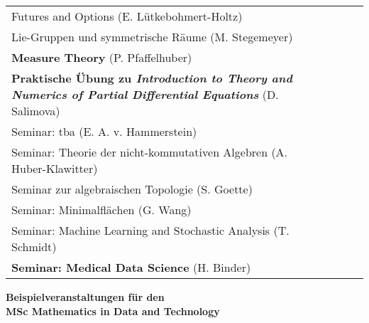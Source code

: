 \documentclass[11pt,a4paper]{article}
\newcommand{\xmark}{\ding{55}}
\begin{document}
\begin{longtable}{p{}|c|c|c|c|c}
Futures and Options (E. Lütkebohmert-Holtz) & & &  \xmark & & \\[1ex]
Lie-Gruppen und symmetrische Räume (M. Stegemeyer) & & & & \xmark & \\[1ex]
{\bf Measure Theory} (P. Pfaffelhuber) & & & &  \xmark & \\[1ex]
{\bf Praktische Übung zu {\em Introduction to Theory and Numerics of Partial Differential Equations}} (D. Salimova) & & & &  \xmark & \\[1ex]
Seminar: tba (E. A. v. Hammerstein) & & & & &  \xmark \\[1ex]
Seminar: Theorie der nicht-kommutativen Algebren (A. Huber-Klawitter) & & & & &  \xmark \\[1ex]
Seminar zur algebraischen Topologie (S. Goette) & & & & &  \xmark \\[1ex]
Seminar: Minimalflächen (G. Wang) & & & & &  \xmark \\[1ex]
Seminar: Machine Learning and Stochastic Analysis (T. Schmidt) & & & & &  \xmark \\[1ex]
{\bf Seminar: Medical Data Science} (H. Binder) & & & & &  \xmark \\[1ex]
\end{longtable}



\clearpage
{}
\thispagestyle{empty}
\vspace*{\fill}
\begin{center}
\Huge\bfseries Beispielveranstaltungen für den 
\\
MSc Mathematics in Data and Technology
\end{center}
\vspace*{\fill}\vspace*{\fill}\clearpage

\vfill

\thispagestyle{empty}
\clearpage


\end{document}
